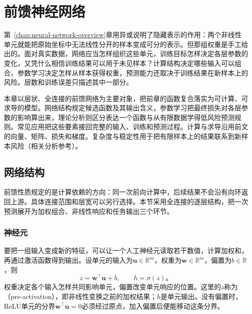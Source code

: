 \chapter{前馈神经网络}
\label{chap:feedforward-networks}

第~\ref{chap:neural-network-overview}章用异或说明了隐藏表示的作用：两个非线性单元就能把原始坐标中无法线性分开的样本变成可分的表示。但那组权重是手工给出的。面对真实数据，网络应当怎样组织这些单元，训练目标怎样决定各层参数的变化，又凭什么相信训练结果可以用于未见样本？计算结构决定哪些输入可以组合，参数学习决定怎样从样本获得权重，预测能力还取决于训练结果在新样本上的风险。层数和训练误差只描述其中一部分。

本章以层状、全连接的前馈网络为主要对象，把前章的函数复合落实为可计算、可求导的模型。网络结构规定候选函数及其输出含义，参数学习把最终损失对各层参数的影响算出来，理论分析则区分表达一个函数与从有限数据学得低风险预测规则。常见应用把这些要素接回完整的输入、训练和预测过程。计算与求导沿用前文的向量、矩阵、损失和梯度。复杂度与稳定性用于把有限样本上的结果联系到新样本风险（相关分析参考）。

\section{网络结构}
\label{sec:ffn-structure}

前馈性质规定的是计算依赖的方向：同一次前向计算中，后续结果不会沿有向环返回上游。具体连接范围和层宽可以另行选择。本节采用全连接的逐层结构，把一次预测展开为加权组合、非线性响应和任务输出三个环节。

\subsection{神经元}
\label{sec:ffn-neuron}

要把一组输入变成新的特征，可以让一个人工神经元读取若干数值，计算加权和，再通过激活函数得到输出。设单元的输入为$\bm{u}\in\mathbb{R}^{m}$，权重为$\bm{w}\in\mathbb{R}^{m}$，偏置为$b\in\mathbb{R}$，则
\begin{equation}
  z=\bm{w}^{\top}\bm{u}+b,
  \qquad h=\sigma(z)\text{。}
  \label{eq:ffn-unit}
\end{equation}
权重决定各个输入怎样共同影响单元，偏置改变单元响应的位置。这里的$z$称为（pre-activation），即非线性变换之前的加权结果；$h$是单元输出。没有偏置时，ReLU单元的分界$\bm{w}^{\top}\bm{u}=0$必须经过原点，加入偏置后便能移动这条分界。

